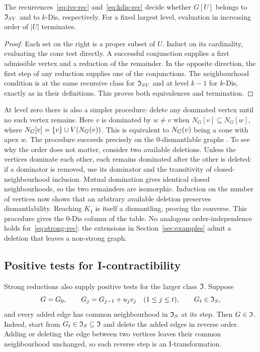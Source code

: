 \begin{proposition}\label{prop:vertex-correct}
The recurrences~\eqref{eq:ivs-rec} and~\eqref{eq:kdis-rec} decide
whether $G[U]$ belongs to $\mathfrak I_{SV}$ and to $k$-Dis, respectively. For a
fixed largest level, evaluation in increasing order of $|U|$
terminates.
\end{proposition}
\begin{proof}
Each set on the right is a proper subset of $U$. Induct on its
cardinality, evaluating the cone test directly. A successful
conjunction supplies a first admissible vertex and a reduction of
the remainder. In the opposite direction, the first step of any
reduction supplies one of the conjunctions. The neighbourhood
condition is at the same recursive class for $\mathfrak I_{SV}$ and at level
$k-1$ for $k$-Dis, exactly as in their definitions. This proves both
equivalences and termination.
\end{proof}

At level zero there is also a simpler procedure: delete any dominated
vertex until no such vertex remains. Here $v$ is dominated by $w\ne v$
when $N_G[v]\subseteq N_G[w]$, where $N_G[v]=\{v\}\cup V(N_G(v))$.
This is equivalent to $N_G(v)$ being a cone with apex $w$.
The procedure succeeds precisely on the $0$-dismantlable graphs
\cite[Section~4.1]{FieuxJouve2020}. To see why the order does not
matter, consider two available deletions. Unless the vertices dominate
each other, each remains dominated after the other is deleted:
if a dominator is removed, use its dominator and the transitivity of
closed-neighbourhood inclusion. Mutual domination gives identical
closed neighbourhoods, so the two remainders are isomorphic.
Induction on the number of vertices now shows that an arbitrary
available deletion preserves dismantlability. Reaching $K_1$ is itself
a dismantling, proving the converse. This procedure gives the
$0$-Dis column of the table.
No analogous order-independence holds for~\eqref{eq:strong-rec}:
the extensions in Section~\ref{sec:examples} admit a deletion that
leaves a non-strong graph.

\subsection{Positive tests for I-contractibility}

Strong reductions also supply positive tests for the larger class
$\mathfrak I$. Suppose
\begin{equation}\label{eq:I-path}
 G=G_0,\qquad G_j=G_{j-1}+u_jv_j\quad(1\le j\le t),
 \qquad G_t\in\mathfrak I_S,
\end{equation}
and every added edge has common neighbourhood in $\mathfrak I_S$ at its step.
Then $G\in\mathfrak I$. Indeed, start from $G_t\in\mathfrak I_S\subseteq\mathfrak I$ and delete
the added edges in reverse order. Adding or deleting the edge between
two vertices leaves their common neighbourhood unchanged, so each
reverse step is an I-transformation.


